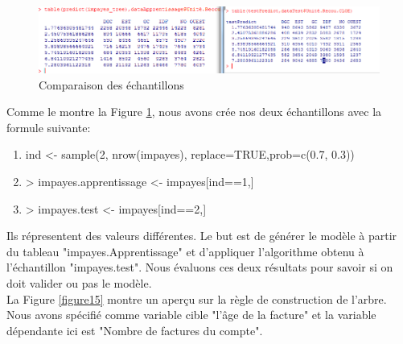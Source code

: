 \documentclass[11pt,a4paper]{report}
\begin{document}
\begin{figure}[h]
   \centering
   \includegraphics[scale=0.75]{compare.PNG}
     \caption{Comparaison des échantillons}
     \label{echantillon}
\end{figure}

 Comme le montre la Figure \ref{echantillon}, nous avons crée
 nos deux échantillons avec la formule suivante: 
  \begin{enumerate}
\item  ind <- sample(2, nrow(impayes), replace=TRUE,prob=c(0.7, 0.3))
\item  > impayes.apprentissage <- impayes[ind==1,]
\item  > impayes.test <- impayes[ind==2,]
\end{enumerate}
 
  Ils répresentent  des valeurs différentes. Le but est de générer le modèle à partir du tableau "impayes.Apprentissage" et d'appliquer l'algorithme obtenu à l'échantillon "impayes.test". Nous évaluons ces deux résultats pour savoir si on doit valider ou pas le modèle. \\
  La Figure \ref{figure15} montre un aperçu sur la règle de construction de l'arbre. Nous avons spécifié comme variable cible "l'âge de la facture" et la variable dépendante ici est "Nombre de factures du compte".
\end{document}
